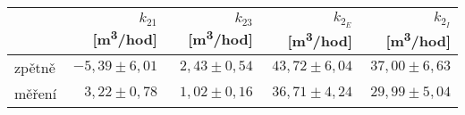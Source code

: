 \begin{tabular}{lrrrr}
\toprule
{} & $k_{21}$ [\si{m^3/hod}] & $k_{23}$ [\si{m^3/hod}] & $k_{2_E}$ [\si{m^3/hod}] & $k_{2_I}$ [\si{m^3/hod}] \\
\midrule
zpětně &            $-5,39\pm6,01 $&             $2,43\pm0,54 $&            $43,72\pm6,04 $&            $37,00\pm6,63 $\\
měření &            $ 3,22\pm0,78 $&             $1,02\pm0,16 $&            $36,71\pm4,24 $&            $29,99\pm5,04 $\\
\bottomrule
\end{tabular}
